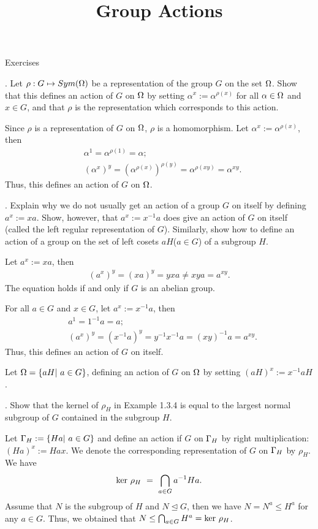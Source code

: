 \documentclass[12pt]{amsart}
\def\a{\alpha} \def\b{\beta} \def\g{\gamma} \def\d{\delta} \def\e{\varepsilon}
\def\r{\rho} \def\o{\sigma} \def\t{\tau} \def\w{\omega} \def\k{\kappa}
\def\m{\medskip} \def\l{\noindent} \def\x{$\!\,$} \def\J{$-\!\,$}
\def\pf{\noindent {\it Proof.\ }}
\begin{document}
\title[Group Actions]
{Group Actions}%
\maketitle

\l Exercises

\l 1. Let $\r: G\mapsto Sym(\O)$ be a representation of the group $G$ on the set $\Omega$. Show that this defines an action of $G$ on $\Omega$ by setting $\a^x:=\a^{\r(x)}$ for all $\a\in \O$ and $x\in G$, and that $\r$ is the representation which corresponds to this action.

\pf Since $\r$ is a representation of $G$ on $\Omega$, $\r$ is a homomorphism. Let $\a^x:=\a^{\r(x)}$, then
\begin{align*}
 &\a^1=\a^{\r(1)}=\a;\\
 &(\a^x)^y=(\a^{\r(x)})^{\r(y)}=\a^{\r(xy)}=\a^{xy}.
\end{align*}
Thus, this defines an action of $G$ on $\Omega$.

\m

\l 2. Explain why we do not usually get an action of a group $G$ on itself by defining $a^x:=xa$. Show, however, that $a^x:=x^{-1}a$ does give an action of $G$ on itself (called the left regular representation of $G$). Similarly, show how to define an action of a group on the set of left cosets $aH$($a\in G$) of a subgroup $H$.

\pf Let $a^x:=xa$, then
\begin{align*}
 (a^x)^y=(xa)^y=yxa \neq xya=a^{xy}.
\end{align*}
The equation holds if and only if $G$ is an abelian group.

For all $a\in G$ and $x\in G$, let $a^x:=x^{-1}a$, then
\begin{align*}
 &a^1=1^{-1}a=a;\\
 &(a^x)^y=(x^{-1}a)^{y}=y^{-1}x^{-1}a=(xy)^{-1}a=a^{xy}.
\end{align*}
Thus, this defines an action of $G$ on itself.

Let $\Omega=\{aH|\ a\in G\}$, defining an action of $G$ on $\Omega$ by setting $(aH)^x:=x^{-1}aH$.

\m

\l 3. Show that the kernel of $\r_H$ in Example 1.3.4 is equal to the largest normal subgroup of $G$ contained in the subgroup $H$.

\pf Let $\Gamma_H:=\{Ha|\ a\in G\}$ and define an action if $G$ on $\Gamma_H$ by right multiplication: $(Ha)^x:=Hax$. We denote the corresponding representation of $G$ on $\Gamma_H$ by $\r_H$. We have
\begin{align*}
 {\rm ker}\ \r_H\ =\ \bigcap_{a\in G}a^{-1}Ha.
\end{align*}
Assume that $N$ is the subgroup of $H$ and $N\unlhd G$, then we have $N=N^a\le H^a$ for any $a\in G$. Thus, we obtained that $N\le \bigcap_{a\in G}H^a={\rm ker}\ \r_H$.
\end{document}

